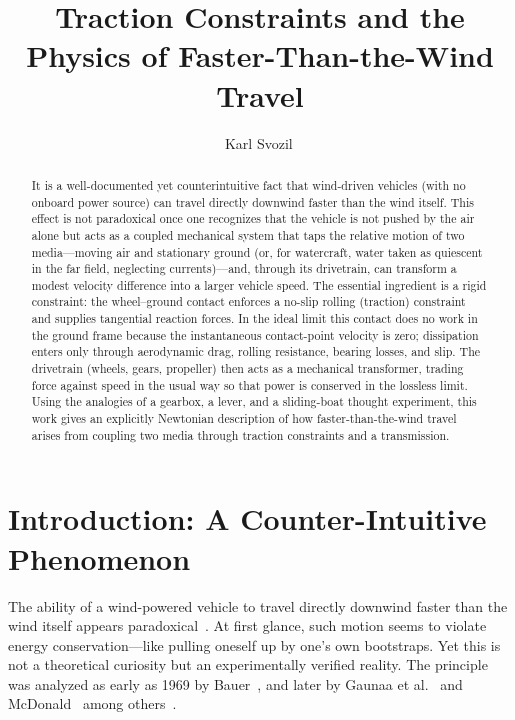 \documentclass[reprint,aps,pra,longbibliography]{revtex4-2}
\begin{document}
\title{Traction Constraints and the Physics of Faster-Than-the-Wind Travel}

\author{Karl Svozil\,}


\begin{abstract}
It is a well-documented yet counterintuitive fact that wind-driven vehicles (with no onboard power source) can travel directly downwind faster than the wind itself. This effect is not paradoxical once one recognizes that the vehicle is not pushed by the air alone but acts as a coupled mechanical system that taps the relative motion of two media---moving air and stationary ground (or, for watercraft, water taken as quiescent in the far field, neglecting currents)---and, through its drivetrain, can transform a modest velocity difference into a larger vehicle speed. The essential ingredient is a rigid constraint: the wheel--ground contact enforces a no-slip rolling (traction) constraint and supplies tangential reaction forces. In the ideal limit this contact does no work in the ground frame because the instantaneous contact-point velocity is zero; dissipation enters only through aerodynamic drag, rolling resistance, bearing losses, and slip. The drivetrain (wheels, gears, propeller) then acts as a mechanical transformer, trading force against speed in the usual way so that power is conserved in the lossless limit. Using the analogies of a gearbox, a lever, and a sliding-boat thought experiment, this work gives an explicitly Newtonian description of how faster-than-the-wind travel arises from coupling two media through traction constraints and a transmission.
\end{abstract}

\maketitle

\section{Introduction: A Counter-Intuitive Phenomenon}

The ability of a wind-powered vehicle to travel directly downwind faster than the wind itself appears paradoxical~\cite{Blackford1978,Stong1975,mcdonald2021}. At first glance, such motion seems to violate energy conservation---like pulling oneself up by one's own bootstraps. Yet this is not a theoretical curiosity but an experimentally verified reality. The principle was analyzed as early as 1969 by Bauer~\cite{Bauer1969,bauer1971sailing,bauer1974taking}, and later by  Gaunaa et al.~\cite{Gaunaa2009} and  McDonald~\cite{mcdonald2021} among others~\cite{khan2013analysis,AAPT2013}.
\end{document}
